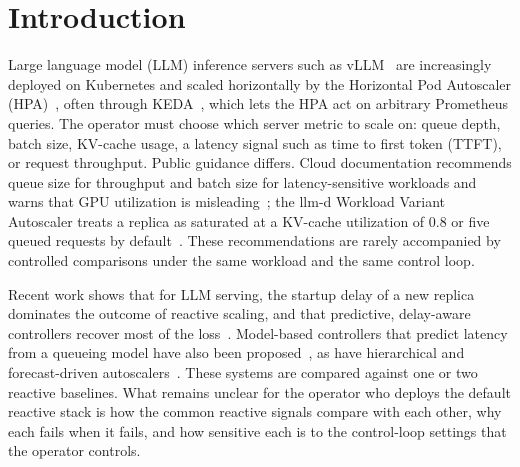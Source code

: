 \documentclass[10pt,conference]{IEEEtran}
\begin{document}
\section{Introduction}
Large language model (LLM) inference servers such as vLLM~\cite{kwon2023vllm}
are increasingly deployed on Kubernetes and scaled horizontally by the
Horizontal Pod Autoscaler (HPA)~\cite{k8shpa}, often through KEDA~\cite{keda},
which lets the HPA act on arbitrary Prometheus queries. The operator must
choose which server metric to scale on: queue depth, batch size, KV-cache
usage, a latency signal such as time to first token (TTFT), or request
throughput. Public guidance differs. Cloud documentation recommends queue size
for throughput and batch size for latency-sensitive workloads and warns that
GPU utilization is misleading~\cite{gke2026autoscaling}; the llm-d Workload
Variant Autoscaler treats a replica as saturated at a KV-cache utilization of
0.8 or five queued requests by default~\cite{llmdwva}. These
recommendations are rarely accompanied by controlled comparisons under the
same workload and the same control loop.

Recent work shows that for LLM serving, the startup delay of a new replica
dominates the outcome of reactive scaling, and that predictive, delay-aware
controllers recover most of the loss~\cite{liu2026decomposing}. Model-based
controllers that predict latency from a queueing model have also been
proposed~\cite{ramani2026queueing}, as have hierarchical and forecast-driven
autoscalers~\cite{patke2025chiron,jaiswal2025sageserve}. These systems are
compared against one or two reactive baselines. What remains unclear for the
operator who deploys the default reactive stack is how the common reactive
signals compare with each other, why each fails when it fails, and how
sensitive each is to the control-loop settings that the operator controls.
\end{document}
